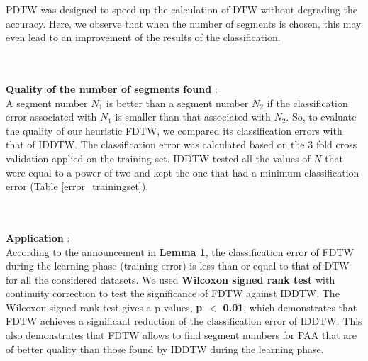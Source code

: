 PDTW was designed to speed up the calculation of DTW without degrading the accuracy. Here, we observe that when the number of segments is chosen, this may even lead to an improvement of the results of the classification.



\\
 \paragraph{}\textbf{Quality of the number of segments found} :  \\
 A segment number $N_1$ is better than a segment number $N_2$ if the classification
 error associated with $N_1$ is smaller than that associated with $N_2$. So, to evaluate the
 quality of our heuristic FDTW, we compared its classification errors with that of IDDTW.
  The classification error  was calculated based on the 3 fold cross validation 
  applied on the training set. IDDTW tested all the values of $N$ that were equal to a power of two and kept the one that had  a minimum
classification error (Table \ref{error_trainingset}).


\\
 \paragraph{}\textbf{Application} : \\
According to the announcement in \textbf{Lemma 1}, the classification error of FDTW during the learning phase (training error) is less
than or equal to that of DTW for all the considered datasets.  We used \textbf{Wilcoxon signed rank test} with continuity
correction to test the significance of FDTW against IDDTW.  The Wilcoxon signed rank test gives a
p-values, \textbf{ p $<$ 0.01}, which demonstrates that FDTW achieves a
significant reduction of the classification error of IDDTW. This also demonstrates that FDTW allows
to find segment numbers for PAA that are of better quality than those found by IDDTW during the learning phase.

